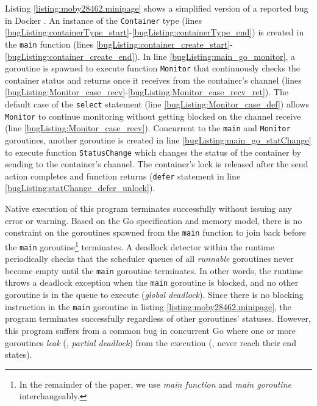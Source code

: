 %

Listing \ref{listing:moby28462.minipage} shows a simplified version of a reported bug in Docker \cite{moby-28462-commit}.
%
An instance of the \texttt{Container} type (lines \ref{bugListing:containerType_start}-\ref{bugListing:containerType_end}) is created in the \texttt{main} function (lines \ref{bugListing:container_create_start}-\ref{bugListing:container_create_end}).
%
In line \ref{bugListing:main_go_monitor}, a goroutine is spawned to execute function \texttt{Monitor} that continuously checks the container status and returns once it receives from the container's channel (lines \ref{bugListing:Monitor_case_recv}-\ref{bugListing:Monitor_case_recv_ret}).
%
The default case of the \texttt{select} statement (line \ref{bugListing:Monitor_case_def}) allows \texttt{Monitor} to continue monitoring without getting blocked on the channel receive (line \ref{bugListing:Monitor_case_recv}).
%
Concurrent to the \texttt{main} and \texttt{Monitor} goroutines, another goroutine is created in line  \ref{bugListing:main_go_statChange} to execute function \texttt{StatusChange} which changes the status of the container by sending to the container's channel.
%
The container's lock is released after the send action completes and function returns (\texttt{defer} statement in line \ref{bugListing:statChange_defer_unlock}).
%


Native execution of this program terminates successfully without issuing any error or warning.
%
Based on the Go specification and memory model, there is no constraint on the goroutines spawned from the \texttt{main} function to join back before the \texttt{main} goroutine\footnote{In the remainder of the paper, we use \textit{main function} and \textit{main goroutine} interchangeably.} terminates.
%
A deadlock detector within the runtime periodically checks that the scheduler queues of all \textit{runnable} goroutines never become empty until the \texttt{main} goroutine terminates.
%
In other words, the runtime throws a deadlock exception when the \texttt{main} goroutine is blocked, and no other goroutine is in the queue to execute (\ie \textit{global deadlock}).
%
Since there is no blocking instruction in the \texttt{main} goroutine in listing \ref{listing:moby28462.minipage}, the program terminates successfully regardless of other goroutines' statuses.
%
However, this program suffers from a common bug in concurrent Go where one or more goroutines \textit{leak} (\ie, \textit{partial deadlock}) from the execution (\ie, never reach their end states).

